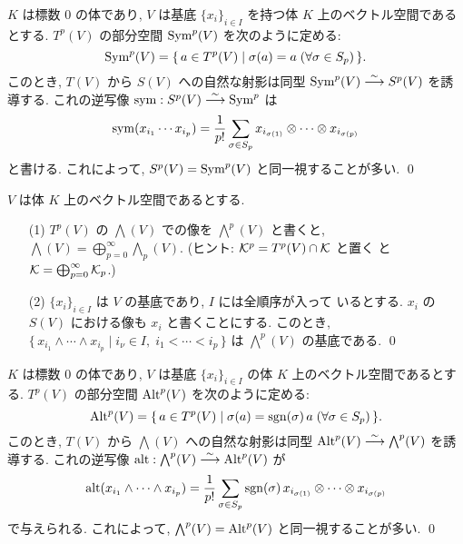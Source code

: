 \documentclass[12pt,twoside]{jarticle}
\begin{document}
\begin{question}
  $K$ は標数 $0$ の体であり, 
  $V$ は基底 $\{x_i\}_{i\in I}$ を持つ体 $K$ 上のベクトル空間であるとする.
  $T^p(V)$ の部分空間 $\mathop{\mathrm{Sym}}\nolimits^p(V)$ を次のように定める:
  \begin{equation*}
    \mathop{\mathrm{Sym}}\nolimits^p(V) 
    = \{\,a\in T^p(V) \mid \sigma(a)=a\; (\forall \sigma\in S_p)\,\}.
  \end{equation*}
  このとき, $T(V)$ から $S(V)$ への自然な射影は同型 $\mathop{\mathrm{Sym}}\nolimits^p(V) \overset\sim\longrightarrow S^p(V)$
  を誘導する. これの逆写像 $\mathop{\mathrm{sym}}\nolimits: S^p(V)\overset\sim\longrightarrow\mathop{\mathrm{Sym}}\nolimits^p$ は
  \begin{equation*}
    \mathop{\mathrm{sym}}\nolimits(x_{i_1}\cdots x_{i_p})
    =\frac{1}{p!} \sum_{\sigma\in S_p} 
    x_{i_{\sigma(1)}}\otimes\cdots\otimes x_{i_{\sigma(p)}}
  \end{equation*}
  と書ける.  これによって, $S^p(V)=\mathop{\mathrm{Sym}}\nolimits^p(V)$ と同一視することが多い. \qed
\end{question}

\begin{question}
  $V$ は体 $K$ 上のベクトル空間であるとする.
  \begin{itemize}
  \item[(1)] $T^p(V)$ の $\bigwedge(V)$ での像を $\bigwedge^p(V)$ と書くと,
    $\bigwedge(V) = \bigoplus_{p=0}^\infty \bigwedge_p(V)$.
    (ヒント: ${\mathcal K}^p=T^p(V)\cap{\mathcal K}$ と置く
    と ${\mathcal K}=\bigoplus_{p=0}^\infty {\mathcal K}_p$.)
  \item[(2)] $\{x_i\}_{i\in I}$ は $V$ の基底であり, $I$ には全順序が入って
    いるとする. $x_i$ の $S(V)$ における像も $x_i$ と書くことにする.
    このとき, $\{\,x_{i_1}\wedge\cdots\wedge x_{i_p}\mid 
    i_\nu\in I,\; i_1<\cdots<i_p\,\}$ は $\bigwedge^p(V)$ の基底である.
    \qed
  \end{itemize}
\end{question}

\begin{question}
  $K$ は標数 $0$ の体であり, 
  $V$ は基底 $\{x_i\}_{i\in I}$ の体 $K$ 上のベクトル空間であるとする.
  $T^p(V)$ の部分空間 $\mathop{\mathrm{Alt}}\nolimits^p(V)$ を次のように定める:
  \begin{equation*}
    \mathop{\mathrm{Alt}}\nolimits^p(V) 
    = \{\,a\in T^p(V) \mid 
    \sigma(a)=\mathop{\mathrm{sgn}}\nolimits(\sigma)\,a\; (\forall \sigma\in S_p)\,\}.
  \end{equation*}
  このとき, $T(V)$ から $\bigwedge(V)$ への自然な射影は同型 %
  $\mathop{\mathrm{Alt}}\nolimits^p(V) \overset\sim\longrightarrow \bigwedge^p(V)$ を誘導する. 
  これの逆写像 $\mathop{\mathrm{alt}}\nolimits:\bigwedge^p(V)\overset\sim\longrightarrow \mathop{\mathrm{Alt}}\nolimits^p(V)$ が
  \begin{equation*}
    \mathop{\mathrm{alt}}\nolimits(x_{i_1}\wedge\cdots\wedge x_{i_p})
    =\frac{1}{p!} \sum_{\sigma\in S_p} 
    \mathop{\mathrm{sgn}}\nolimits(\sigma)\, x_{i_{\sigma(1)}}\otimes\cdots\otimes x_{i_{\sigma(p)}}
  \end{equation*}
  で与えられる. 
  これによって, $\bigwedge^p(V)=\mathop{\mathrm{Alt}}\nolimits^p(V)$ と同一視することが多い. \qed
\end{question}
\end{document}
